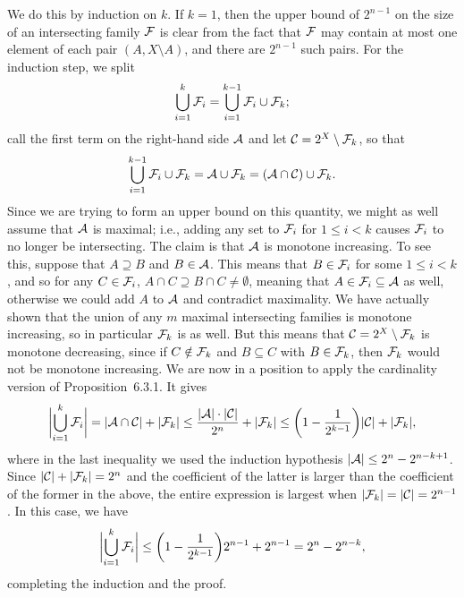 \proof We do this by induction on $k$. If $k=1$, then the upper bound of $2^{n-1}$ on the size of an
intersecting family ${\cal F}$ is clear from the fact that ${\cal F}$ may contain at most one element of each pair
$(A,X\setminus A)$, and there are $2^{n-1}$ such pairs.
For the induction step, we split
$$\bigcup_{i=1}^k {\cal F}_i = \bigcup_{i=1}^{k-1} {\cal F}_i \cup {\cal F}_k;$$
call the first term on the right-hand side ${\cal A}$ and let ${\cal C} = 2^X\setminus {\cal F}_k$, so that
$$\bigcup_{i=1}^{k-1} {\cal F}_i \cup {\cal F}_k = {\cal A} \cup {\cal F}_k = ({\cal A} \cap {\cal C}) \cup {\cal F}_k.$$
Since we are trying to form an upper bound on this quantity,
we might as well assume that ${\cal A}$ is maximal; i.e., adding any set to ${\cal F}_i$ for $1\le i< k$ causes
${\cal F}_i$ to no longer be intersecting. The claim is that ${\cal A}$ is monotone increasing. To see this, suppose
that $A\supseteq B$ and $B\in {\cal A}$. This means that $B\in {\cal F}_i$ for some $1\le i<k$, and so for any $C\in {\cal F}_i$,
$A\cap C \supseteq B\cap C\ne \emptyset$, meaning that $A\in {\cal F}_i\subseteq {\cal A}$ as well, otherwise we could
add $A$ to ${\cal A}$ and contradict maximality. We have actually shown
that the union of any $m$ maximal intersecting families is monotone increasing, so in particular ${\cal F}_k$ is
as well. But this means that ${\cal C} = 2^X\setminus {\cal F}_k$ is monotone decreasing, since if $C\notin {\cal F}_k$
and $B\subseteq C$ with $B\in {\cal F}_k$, then ${\cal F}_k$ would not be monotone increasing. We are now in a position
to apply the cardinality version of Proposition~6.3.1. It gives
$$\biggl|\bigcup_{i=1}^k {\cal F}_i\biggr| = |{\cal A}\cap {\cal C}| + |{\cal F}_k|
\le {|{\cal A}|\cdot|{\cal C}|\over 2^n} + |{\cal F}_k|
\le \biggl(1-{1\over 2^{k-1}}\biggr) |{\cal C}| + |{\cal F}_k|,$$
where in the last inequality we used the induction hypothesis $|{\cal A}| \le 2^n - 2^{n-k+1}$. Since
$|{\cal C}| + |{\cal F}_k| = 2^n$ and the coefficient of the latter is larger than the coefficient of the former
in the above, the entire expression is largest when $|{\cal F}_k| = |{\cal C}| = 2^{n-1}$. In this case, we have
$$\biggl|\bigcup_{i=1}^k {\cal F}_i\biggr| \le \biggl(1-{1\over 2^{k-1}}\biggr) 2^{n-1} + 2^{n-1} = 2^n-2^{n-k},$$
completing the induction and the proof.\slug

\bye
